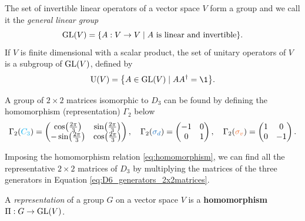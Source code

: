 \begin{definition}
The set of invertible linear operators of a vector space $V$ form a group and we call it the \textit{general linear group}
$$
{\text{GL}}(V) = \qty{A: V \to V \mid A \text{ is linear and invertible}}.
$$
If $V$ is finite dimensional with a scalar product, the set of unitary operators of $V$ is a subgroup of ${\text{GL}}(V)$, defined by
$$
\U(V) = \qty{A \in \GL(V) \mid A A^\dagger = \1}.
$$
\end{definition}

\begin{example} \label{ex:2x2_rep}
A group of $2\times 2$ matrices isomorphic to $D_3$ can be found by defining the homomorphism (representation) $\Gamma_2$ below
\begin{equation} \label{eq:D6_generators_2x2matrices}
\Gamma_2(\Ct) =
\begin{pmatrix}
\cos(\frac{2\pi}{3}) & \sin(\frac{2\pi}{3}) \\
-\sin(\frac{2\pi}{3}) & \cos(\frac{2\pi}{3})
\end{pmatrix},
\quad
\Gamma_2(\sd) =
\begin{pmatrix}
-1 & 0 \\
0 & 1
\end{pmatrix},
\quad
\Gamma_2(\sv) =
\begin{pmatrix}
1 & 0 \\
0 & -1
\end{pmatrix}.
\end{equation}

Imposing the homomorphism relation \ref{eq:homomorphism}, we can find all the representative $2\times 2$ matrices of $D_3$ by multiplying the matrices of the three generators in Equation \ref{eq:D6_generators_2x2matrices}.
\end{example}

\begin{definition}
A \textit{representation} of a group $G$ on a vector space $V$ is a \textbf{homomorphism} $\Pi: G \to {\text{GL}}(V)$.
\end{definition}

